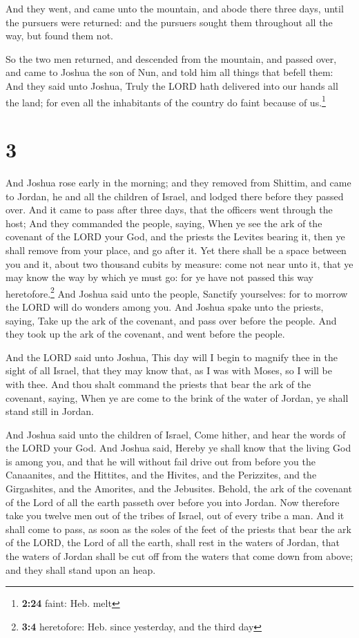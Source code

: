  And they went, and came unto the mountain, and abode
there three days, until the pursuers were returned: and the pursuers
sought them throughout all the way, but found them not.

 So the two men returned, and descended from the
mountain, and passed over, and came to Joshua the son of Nun, and told
him all things that befell them:  And they said unto
Joshua, Truly the LORD hath delivered into our hands all the land; for
even all the inhabitants of the country do faint because of
us.\footnote{\textbf{2:24} faint: Heb. melt}

\hypertarget{section-2}{%
\section{3}\label{section-2}}

 And Joshua rose early in the morning; and they removed
from Shittim, and came to Jordan, he and all the children of Israel, and
lodged there before they passed over.  And it came to pass
after three days, that the officers went through the host;
 And they commanded the people, saying, When ye see the
ark of the covenant of the LORD your God, and the priests the Levites
bearing it, then ye shall remove from your place, and go after it.
 Yet there shall be a space between you and it, about two
thousand cubits by measure: come not near unto it, that ye may know the
way by which ye must go: for ye have not passed this way
heretofore.\footnote{\textbf{3:4} heretofore: Heb. since yesterday, and
  the third day}  And Joshua said unto the people,
Sanctify yourselves: for to morrow the LORD will do wonders among you.
 And Joshua spake unto the priests, saying, Take up the
ark of the covenant, and pass over before the people. And they took up
the ark of the covenant, and went before the people.

 And the LORD said unto Joshua, This day will I begin to
magnify thee in the sight of all Israel, that they may know that, as I
was with Moses, so I will be with thee.  And thou shalt
command the priests that bear the ark of the covenant, saying, When ye
are come to the brink of the water of Jordan, ye shall stand still in
Jordan.

 And Joshua said unto the children of Israel, Come hither,
and hear the words of the LORD your God.  And Joshua
said, Hereby ye shall know that the living God is among you, and that he
will without fail drive out from before you the Canaanites, and the
Hittites, and the Hivites, and the Perizzites, and the Girgashites, and
the Amorites, and the Jebusites.  Behold, the ark of the
covenant of the Lord of all the earth passeth over before you into
Jordan.  Now therefore take you twelve men out of the
tribes of Israel, out of every tribe a man.  And it shall
come to pass, as soon as the soles of the feet of the priests that bear
the ark of the LORD, the Lord of all the earth, shall rest in the waters
of Jordan, that the waters of Jordan shall be cut off from the waters
that come down from above; and they shall stand upon an heap.

